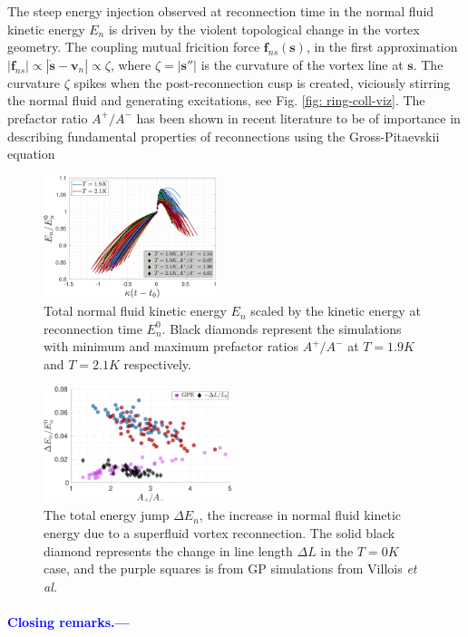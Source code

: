 \documentclass[%
 reprint,
 amsmath,amssymb,
 aps,
 prl,
]{revtex4-2}
\newcommand{\etal}{{\it et al.}~}
\def \s{\mathbf{s}}
\def \v{\mathbf{v}}
\def\blue#1{\textcolor{blue}{#1}}
\begin{document}
The steep energy injection observed at reconnection time in the normal fluid kinetic energy $E_n$ is driven by the violent topological change in the vortex geometry. The coupling mutual fricition force $\mathbf{f}_{ns}(\s)$, in the first approximation $|\mathbf{f}_{ns}|\propto|\dot{\s}-\v_n|\propto\zeta$, where $\zeta=|\s''|$ is the curvature of the vortex line at $\s$. The curvature $\zeta$ spikes when the post-reconnection cusp is created, viciously stirring the normal fluid and generating excitations, see Fig. \ref{fig: ring-coll-viz}. The prefactor ratio $A^+/A^-$ has been shown in recent literature \cite{villoisIrreversibleDynamicsVortex2020,villoisUniversalNonuniversalAspects2017a,promentMatchingTheoryCharacterize2020a} to be of importance in describing fundamental properties of reconnections using the Gross-Pitaevskii equation


\begin{figure}
	\centering
	\includegraphics*[width=0.45\textwidth]{energy-evolution.pdf}
	\caption{Total normal fluid kinetic energy $E_n$ scaled by the kinetic energy at reconnection time $E_n^0$. Black diamonds represent the simulations with minimum and maximum prefactor ratios $A^+/A^-$ at $T=1.9K$ and $T=2.1K$ respectively.}
\end{figure}

\begin{figure}
	\centering
	\includegraphics*[width=0.49\textwidth]{energy-jump.pdf}
	\caption{The total energy jump $\Delta E_n$, the increase in normal fluid kinetic energy due to a superfluid vortex reconnection. The solid black diamond represents the change in line length $\Delta L$ in the $T=0K$ case, and the purple squares is from GP simulations from Villois \etal \cite{villoisIrreversibleDynamicsVortex2020}}
\end{figure}

\blue{
\paragraph*{Closing remarks.---}
\blindtext
}

\end{document}
